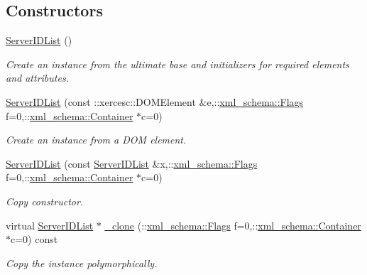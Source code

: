 \subsection*{Constructors}
\begin{DoxyCompactItemize}
\item 
\hypertarget{classopenstack_1_1xml_1_1ServerIDList_acc99b5318fb97195845682585b421ca9}{
\hyperlink{classopenstack_1_1xml_1_1ServerIDList_acc99b5318fb97195845682585b421ca9}{ServerIDList} ()}
\label{classopenstack_1_1xml_1_1ServerIDList_acc99b5318fb97195845682585b421ca9}

\begin{DoxyCompactList}\small\item\em Create an instance from the ultimate base and initializers for required elements and attributes. \item\end{DoxyCompactList}\item 
\hyperlink{classopenstack_1_1xml_1_1ServerIDList_a90fc37b99e432cd1417b09b909c1a4ee}{ServerIDList} (const ::xercesc::DOMElement \&e,::\hyperlink{namespacexml__schema_affb4c227cbd9aa7453dd1dc5a1401943}{xml\_\-schema::Flags} f=0,::\hyperlink{namespacexml__schema_a333dea2213742aea47a37532dec4ec27}{xml\_\-schema::Container} $\ast$c=0)
\begin{DoxyCompactList}\small\item\em Create an instance from a DOM element. \item\end{DoxyCompactList}\item 
\hyperlink{classopenstack_1_1xml_1_1ServerIDList_acaf51586b4bb8ccd345933c6133c0adf}{ServerIDList} (const \hyperlink{classopenstack_1_1xml_1_1ServerIDList}{ServerIDList} \&x,::\hyperlink{namespacexml__schema_affb4c227cbd9aa7453dd1dc5a1401943}{xml\_\-schema::Flags} f=0,::\hyperlink{namespacexml__schema_a333dea2213742aea47a37532dec4ec27}{xml\_\-schema::Container} $\ast$c=0)
\begin{DoxyCompactList}\small\item\em Copy constructor. \item\end{DoxyCompactList}\item 
virtual \hyperlink{classopenstack_1_1xml_1_1ServerIDList}{ServerIDList} $\ast$ \hyperlink{classopenstack_1_1xml_1_1ServerIDList_a42750b22c1b94af4ba451b619d6a5b65}{\_\-clone} (::\hyperlink{namespacexml__schema_affb4c227cbd9aa7453dd1dc5a1401943}{xml\_\-schema::Flags} f=0,::\hyperlink{namespacexml__schema_a333dea2213742aea47a37532dec4ec27}{xml\_\-schema::Container} $\ast$c=0) const 
\begin{DoxyCompactList}\small\item\em Copy the instance polymorphically. \item\end{DoxyCompactList}\end{DoxyCompactItemize}


